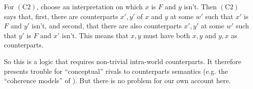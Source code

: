 \documentclass[11pt]{woarticle}
\newcommand{\cmnt}[1]{\iffalse #1 \fi}
\theoremstyle{break}
\theoremstyle{nonumberplain}
\newcommand{\s}[1]{\ensuremath{\mathsf{#1}}}
\newcommand{\1}{\;\,|\;\,}
\newcommand{\T}[1]{\ensuremath{(\mathrm{ #1})}}
\begin{document}
{For \T{C2}, choose an interpretation on which $x$ is $F$ and $y$
isn't. Then \T{C2} says that, first, there are counterparts $x',y'$ of
$x$ and $y$ at some $w'$ such that $x'$ is $F$ and $y'$ isn't, and
second, that there are also counterparts $x',y'$ at some $w'$ such
that $y'$ is $F$ and $x'$ isn't. This means that $x,y$ must have both
$x,y$ and $y,x$ as counterparts.

So this is a logic that requires non-trivial intra-world
counterparts. It therefore presents trouble for ``conceptual'' rivals
to counterparts semantics (e.g. the ``coherence models'' of
\cite{kracht05semantics}). But there is no problem for our own account
here.

} %

\cmnt{%
  Since $CP$ and $CN$ are just strengthened versions of \s{P} and \s{N}, I might
  drop them from the base logics at this point, and talk about them later, when
  I look at extensions of the base logics. At that point, I could also point out
  that substitution is fully definable in $CC$, and that lambda substitution
  might do in FUI and LL in $CN$ (and perhaps in $CP$).
}
\end{document}
